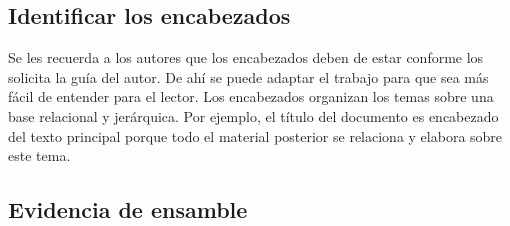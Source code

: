     \subsection{Identificar los encabezados}
    
    Se les recuerda a los autores que los encabezados deben de estar conforme los solicita la guía del autor. De ahí se puede adaptar el trabajo para que sea más fácil de entender para el lector.
    Los encabezados organizan los temas sobre una base relacional y jerárquica. Por ejemplo, el título del documento es encabezado del texto principal porque todo el material posterior se relaciona y elabora sobre este tema. 
    
    \subsection{Evidencia de ensamble}
    
    
